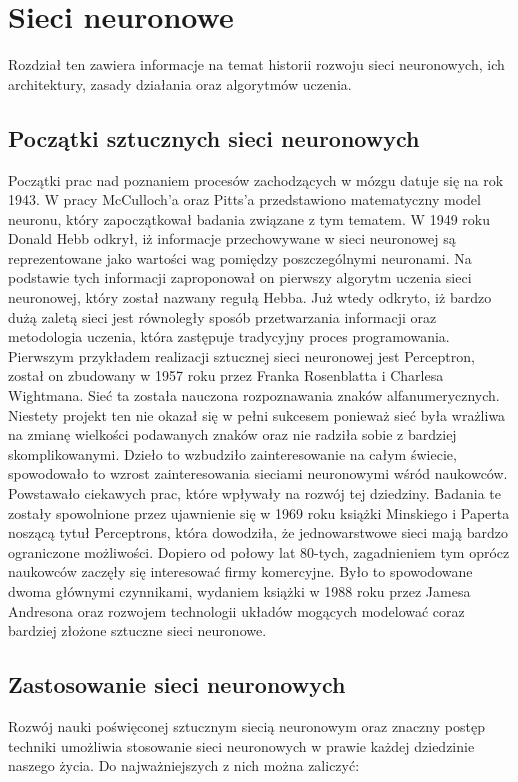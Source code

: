 \chapter{Sieci neuronowe}
\label{cha:sztuczne_sieci_neuronowe}

Rozdział ten zawiera informacje na temat historii rozwoju sieci neuronowych, ich architektury, zasady działania oraz algorytmów uczenia.

\section{Początki sztucznych sieci neuronowych}
Początki prac nad poznaniem procesów zachodzących w mózgu datuje się na rok 1943. W pracy McCulloch'a oraz Pitts'a przedstawiono matematyczny model neuronu, który zapoczątkował badania związane z tym tematem. W 1949 roku Donald Hebb odkrył, iż informacje przechowywane w sieci neuronowej są reprezentowane jako wartości wag pomiędzy poszczególnymi neuronami. Na podstawie tych informacji zaproponował on pierwszy algorytm uczenia sieci neuronowej, który został nazwany regułą Hebba. Już wtedy odkryto, iż bardzo dużą zaletą sieci jest równoległy sposób przetwarzania informacji oraz metodologia uczenia, która zastępuje tradycyjny proces programowania. Pierwszym przykładem realizacji sztucznej sieci neuronowej jest Perceptron, został on zbudowany w 1957 roku przez Franka Rosenblatta i Charlesa Wightmana. Sieć ta została nauczona rozpoznawania znaków alfanumerycznych. Niestety projekt ten nie okazał się w pełni sukcesem ponieważ sieć była wrażliwa na zmianę wielkości podawanych znaków oraz nie radziła sobie z bardziej skomplikowanymi. Dzieło to wzbudziło zainteresowanie na całym świecie, spowodowało to wzrost zainteresowania sieciami neuronowymi wśród naukowców. Powstawało ciekawych prac, które wpływały na rozwój tej dziedziny. Badania te zostały spowolnione przez ujawnienie się w 1969 roku książki Minskiego i Paperta noszącą tytuł Perceptrons, która dowodziła, że jednowarstwowe sieci mają bardzo ograniczone możliwości. 
Dopiero od połowy lat 80-tych, zagadnieniem tym oprócz naukowców zaczęły się interesować firmy komercyjne. Było to spowodowane dwoma głównymi czynnikami, wydaniem książki w 1988 roku przez Jamesa Andresona oraz rozwojem technologii układów mogących modelować coraz bardziej złożone sztuczne sieci neuronowe.

\section{Zastosowanie sieci neuronowych}
Rozwój nauki poświęconej sztucznym siecią neuronowym oraz znaczny postęp techniki umożliwia stosowanie sieci neuronowych w prawie każdej dziedzinie naszego życia. Do najważniejszych z nich można zaliczyć:

